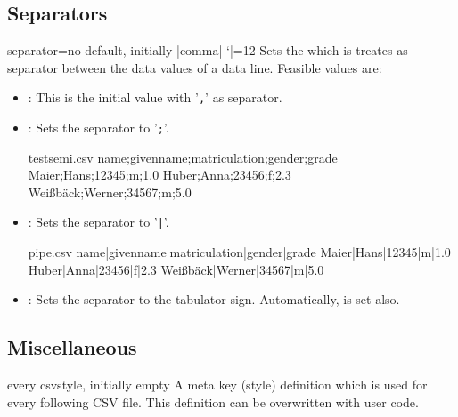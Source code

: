 \documentclass[a4paper,11pt]{ltxdoc}
\begin{document}
\subsection{Separators}\label{sec:separators}%
\begin{docCsvKey}{separator}{=}{no default, initially |comma|}
  \catcode `|=12
  Sets the  which is treates as separator between the data values
  of a data line. Feasible values are:
  \begin{itemize}
  \item{}: This is the initial value with '\texttt{,}' as separator.
  \medskip

  \item{}: Sets the separator to '\texttt{;}'.
\begin{dispExample}
\begin{tcbverbatimwrite}{testsemi.csv}
  name;givenname;matriculation;gender;grade
  Maier;Hans;12345;m;1.0
  Huber;Anna;23456;f;2.3
  Weißbäck;Werner;34567;m;5.0
\end{tcbverbatimwrite}

\end{dispExample}
\medskip

\item{}: Sets the separator to '\texttt{|}'.
\begin{dispExample}
\begin{tcbverbatimwrite}{pipe.csv}
  name|givenname|matriculation|gender|grade
  Maier|Hans|12345|m|1.0
  Huber|Anna|23456|f|2.3
  Weißbäck|Werner|34567|m|5.0
\end{tcbverbatimwrite}

\end{dispExample}
\medskip

\item{}: Sets the separator to the tabulator sign.
  Automatically,  is set also.
  \end{itemize}
\end{docCsvKey}

\clearpage
\subsection{Miscellaneous}%

\begin{docCsvKey}{every csv}{}{style, initially empty}
  A meta key (style) definition which is used for every following CSV file.
  This definition can be overwritten with user code.
\begin{dispListing}
\end{dispListing}
\end{docCsvKey}
\end{document}
